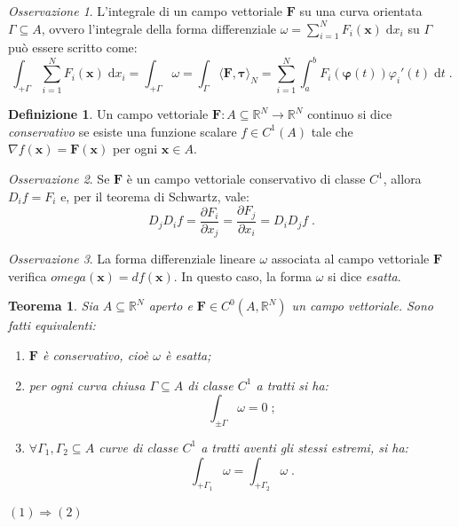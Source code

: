 \documentclass[a4paper,12pt]{report}
\theoremstyle{plain}
\newtheorem{thm}{Teorema}[section]
\theoremstyle{definition}
\newtheorem{defn}{Definizione}[section]
\theoremstyle{remark}
\newtheorem{oss}{Osservazione}[section]
\newcommand{\diff}[1]{\mathrm{d}#1}
\numberwithin{equation}{section}
\begin{document}
\begin{oss} L'integrale di un campo vettoriale $\mathbf{F}$ su una curva orientata $\Gamma\subseteq A$, ovvero l'integrale della forma differenziale $\omega=\sum_{i=1}^N F_i(\mathbf{x})\;\diff{x}_i$ su $\Gamma$ può essere scritto come:
\begin{equation}
\int_{+\Gamma}\sum_{i=1}^N F_i(\mathbf{x})\;\diff{x}_i=\int_{+\Gamma}\omega=\int_{\Gamma}\langle\mathbf{F},\boldsymbol{\tau}\rangle_N=\sum_{i=1}^N\int_a^b F_i(\boldsymbol{\varphi}(t))\varphi_i'(t)\;\diff{t}\;.
\end{equation}
\end{oss}
\begin{defn} Un campo vettoriale $\mathbf{F}:A\subseteq\mathbb{R}^N\to\mathbb{R}^N$ continuo si dice \textit{conservativo} se esiste una funzione scalare $f\in C^1(A)$ tale che $\nabla f(\mathbf{x})=\mathbf{F}(\mathbf{x})$ per ogni $\mathbf{x}\in A$.
\end{defn}
\begin{oss} Se $\mathbf{F}$ è un campo vettoriale conservativo di classe $C^1$, allora $D_if=F_i$ e, per il teorema di Schwartz, vale:
\begin{equation}
D_jD_if=\frac{\partial F_i}{\partial x_j}=\frac{\partial F_j}{\partial x_i}=D_iD_j f\;.
\end{equation}
\end{oss}
\begin{oss} La forma differenziale lineare $\omega$ associata al campo vettoriale $\mathbf{F}$ verifica $omega(\mathbf{x})=df(\mathbf{x})$. In questo caso, la forma $\omega$ si dice \textit{esatta}.
\end{oss}
\begin{thm} Sia $A\subseteq\mathbb{R}^N$ aperto e $\mathbf{F}\in C^0(A,\mathbb{R}^N)$ un campo vettoriale. Sono fatti equivalenti:
\begin{enumerate}
 \item $\mathbf{F}$ è conservativo, cioè $\omega$ è esatta;
 \item per ogni curva chiusa $\Gamma\subseteq A$ di classe $C^1$ a tratti si ha:
\begin{equation}
\int_{\pm\Gamma}\omega=0\;;
\end{equation}
\item $\forall \Gamma_1,\Gamma_2\subseteq A$ curve di classe $C^1$ a tratti aventi gli stessi estremi, si ha:
\begin{equation}
\int_{+\Gamma_1}\omega=\int_{+\Gamma_2}\omega\;.
\end{equation}
\end{enumerate}
\end{thm}
\proof $(1)\Longrightarrow(2)$ \\
\end{document}
